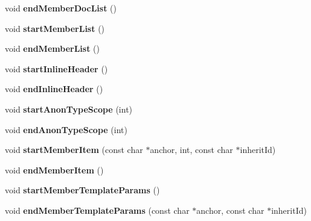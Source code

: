 \begin{DoxyCompactItemize}
\item 
\mbox{\label{class_html_generator_aadbd63f36bef8a7c5f34bf64ff656276}} 
void {\bfseries end\+Member\+Doc\+List} ()
\item 
\mbox{\label{class_html_generator_a0d33ac771fd697fbc6eaf4991d340b08}} 
void {\bfseries start\+Member\+List} ()
\item 
\mbox{\label{class_html_generator_abc6943cf14aadd65c338ef5664e22975}} 
void {\bfseries end\+Member\+List} ()
\item 
\mbox{\label{class_html_generator_ad5d757feeb81868a9cf577256b29cdb4}} 
void {\bfseries start\+Inline\+Header} ()
\item 
\mbox{\label{class_html_generator_ad6bac26d91f76820e6776ab3d8a09558}} 
void {\bfseries end\+Inline\+Header} ()
\item 
\mbox{\label{class_html_generator_af9db4bdc3231e939587cce7efbc1e56e}} 
void {\bfseries start\+Anon\+Type\+Scope} (int)
\item 
\mbox{\label{class_html_generator_ac6ab49e31bbc29399c976e5049fdbd2a}} 
void {\bfseries end\+Anon\+Type\+Scope} (int)
\item 
\mbox{\label{class_html_generator_a47a6941c01a7eeee2002cad26423562e}} 
void {\bfseries start\+Member\+Item} (const char $\ast$anchor, int, const char $\ast$inherit\+Id)
\item 
\mbox{\label{class_html_generator_ade88472c29491eace2d40696d9566ddd}} 
void {\bfseries end\+Member\+Item} ()
\item 
\mbox{\label{class_html_generator_a70e7950bdda5af04b71a58bc3f6e368f}} 
void {\bfseries start\+Member\+Template\+Params} ()
\item 
\mbox{\label{class_html_generator_a00ef5d813c7c390a878bde39fff5cf89}} 
void {\bfseries end\+Member\+Template\+Params} (const char $\ast$anchor, const char $\ast$inherit\+Id)

\end{DoxyCompactItemize}
